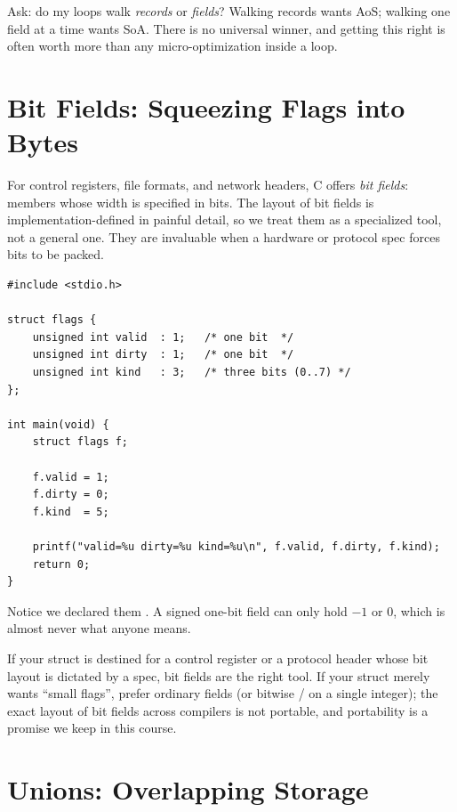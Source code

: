 \begin{insight}
Ask: do my loops walk \emph{records} or \emph{fields}? Walking records
wants AoS; walking one field at a time wants SoA. There is no
universal winner, and getting this right is often worth more than any
micro-optimization inside a loop.
\end{insight}

\section{Bit Fields: Squeezing Flags into Bytes}

For control registers, file formats, and network headers, C offers
\emph{bit fields}: members whose width is specified in bits. The layout
of bit fields is implementation-defined in painful detail, so we treat
them as a specialized tool, not a general one. They are invaluable
when a hardware or protocol spec forces bits to be packed.

\begin{lstlisting}[caption={Bit fields: several flags in one storage unit.}]
#include <stdio.h>

struct flags {
    unsigned int valid  : 1;   /* one bit  */
    unsigned int dirty  : 1;   /* one bit  */
    unsigned int kind   : 3;   /* three bits (0..7) */
};

int main(void) {
    struct flags f;

    f.valid = 1;
    f.dirty = 0;
    f.kind  = 5;

    printf("valid=%u dirty=%u kind=%u\n", f.valid, f.dirty, f.kind);
    return 0;
}
\end{lstlisting}

Notice we declared them . A signed one-bit field can
only hold $-1$ or $0$, which is almost never what anyone means.

\begin{ruleofthumb}
If your struct is destined for a control register or a protocol header
whose bit layout is dictated by a spec, bit fields are the right tool.
If your struct merely wants ``small flags'', prefer ordinary
 fields (or bitwise \code{\&} / \code{|} on a single
integer); the exact layout of bit fields across compilers is not
portable, and portability is a promise we keep in this course.
\end{ruleofthumb}

\section{Unions: Overlapping Storage}

